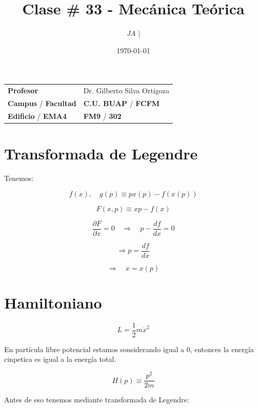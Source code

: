 \documentclass{article}
\title{Clase \# 33 - Mecánica Teórica}
\author{\emph{JA} $\boldsymbol{\mid}$}
\date{\today}
\begin{document}
\maketitle



\begin{mybox}
\noindent\begin{tabular}{@{}ll}
	{\bfseries{Profesor}} & Dr. Gilberto Silva Ortigoza\\
	\textcolor{prussianblue}{\bfseries{Campus}} / \textcolor{trueblue}{\bfseries{Facultad}}  & \textcolor{prussianblue}{\bfseries{C.U. BUAP}} /  \textcolor{trueblue}{\bfseries{FCFM}} \\
	\textcolor{prussianblue}{\bfseries{Edificio}} /  \textcolor{trueblue}{\bfseries{EMA4}}    & 	\textcolor{prussianblue}{\bfseries{FM9}} /  \textcolor{trueblue}{\bfseries{302}}   
\end{tabular} 
\end{mybox} \vspace{1cm}

\tableofcontents

\vspace{2cm}

\section{Transformada de Legendre}

Tenemos:

\[  f(x), \quad g(p) \equiv px(p) - f(x(p)) \]

\[ F(x,p) \equiv xp-f(x)  \]

\[ \frac{ \partial F }{\partial x} = 0 \quad \Rightarrow \quad p - \frac{df}{dx}=0 \]

\[  \Rightarrow p = \boxed{\frac{df}{dx}  }  \]

\[ \Rightarrow \quad x=x(p)   \]


\section{Hamiltoniano}


\[ L = \frac{1}{2}m\dot{x}^{2}  \]

En partícula libre potencial estamos sonsiderando igual a 0, entonces la energía cinpetica es igual a la energía total.


\[ H(p) \equiv \frac{p^{2}}{2m}  \]


Antes de eso tenemos mediante transformada de Legendre:
\end{document}
